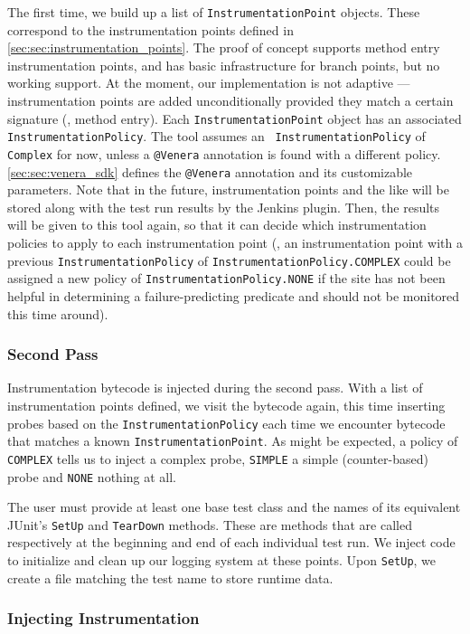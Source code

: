 The first time, we build up a list of {\tt InstrumentationPoint} objects. These
correspond to the instrumentation points defined in
\autoref{sec:sec:instrumentation_points}. The proof of concept supports method
entry instrumentation points, and has basic infrastructure for branch points,
but no working support. At the moment, our implementation is not adaptive ---
instrumentation points are added unconditionally provided they match a certain
signature (\eg, method entry). Each {\tt InstrumentationPoint} object has an
associated {\tt InstrumentationPolicy}. The tool assumes an {\tt
InstrumentationPolicy} of {\tt Complex} for now, unless a {\tt @Venera}
annotation is found with a different policy. \autoref{sec:sec:venera_sdk}
defines the {\tt @Venera} annotation and its customizable parameters. Note
that in the future, instrumentation points and the like will be stored along
with the test run results by the Jenkins plugin. Then, the results will be given
to this tool again, so that it can decide which instrumentation policies to
apply to each instrumentation point (\eg, an instrumentation point with a
previous {\tt InstrumentationPolicy} of {\tt InstrumentationPolicy.COMPLEX}
could be assigned a new policy of {\tt InstrumentationPolicy.NONE} if the site
has not been helpful in determining a failure-predicting predicate and should
not be monitored this time around).

\subsubsection{Second Pass}

Instrumentation bytecode is injected during the second pass. With a list of
instrumentation points defined, we visit the bytecode again, this time inserting
probes based on the {\tt InstrumentationPolicy} each time we encounter bytecode
that matches a known {\tt InstrumentationPoint}. As might be expected, a policy
of {\tt COMPLEX} tells us to inject a complex probe, {\tt SIMPLE} a simple
(counter-based) probe and {\tt NONE} nothing at all.

The user must provide at least one base test class and the names of its
equivalent JUnit's {\tt SetUp} and {\tt TearDown} methods. These are methods
that are called respectively at the beginning and end of each individual test
run. We inject code to initialize and clean up our logging system at these
points. Upon {\tt SetUp}, we create a file matching the test name to store
runtime data.

\subsubsection{Injecting Instrumentation}

